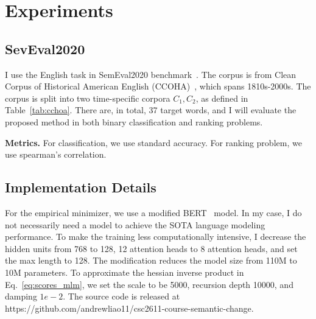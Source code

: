 \section{Experiments}

\subsection{SevEval2020}

I use the English task in SemEval2020 benchmark~\cite{semeval2020}.
The corpus is from Clean Corpus of Historical American English (CCOHA)~\cite{ccoha1,ccoha2}, which spans 1810s-2000s.
The corpus is split into two time-specific corpora $C_1, C_2$, as defined in Table~\ref{tab:cchoa}.
There are, in total, 37 target words, and I will evaluate the proposed method in both binary classification and ranking problems.


\noindent\textbf{Metrics.} 
For classification, we use standard accuracy. For ranking problem, we use spearman's correlation.

\begin{table}[t]
\centering
{}
\caption{Statistics of test corpora. TTR = Type-Token ratio (number of types  / number of tokens * 1000)}
\label{tab:cchoa}
\end{table}


\subsection{Implementation Details}
For the empirical minimizer, we use a modified BERT~\cite{BERT} model.
In my case, I do not necessarily need a model to achieve the SOTA language modeling performance. 
To make the training less computationally intensive, I decrease the hidden units from 768 to 128, 12 attention heads to 8 attention heads, and set the max length to 128.
The modification reduces the model size from 110M to 10M parameters.
To approximate the hessian inverse product in Eq.~\ref{eq:scores_mlm}, we set the scale to be 5000, recursion depth 10000, and damping $1e-2$.
The source code is released at https://github.com/andrewliao11/csc2611-course-semantic-change.


